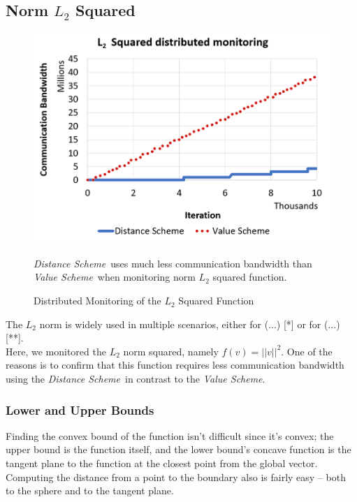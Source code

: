 \documentclass[10pt, conference]{IEEEtran}
\newcommand{\valueScheme}{\textit{Value Scheme}}
\newcommand{\distanceScheme}{\textit{Distance Scheme}}
\begin{document}
\subsection{Norm $L_2$ Squared} \label{L2SquaredExperiment}
\begin{figure}[t]
\includegraphics[width=\linewidth]{Pics/PNGs/L2NormCommunicationDiagram.png}
\caption{Distributed Monitoring of the $L_2$ Squared Function}
\medskip
\small
\distanceScheme \ uses much less communication bandwidth than \valueScheme \ when monitoring norm $L_2$ squared function.
\label{SphereMonitoring}
\end{figure} 
The $L_2$ norm is widely used in multiple scenarios, either for (...) [*] or for (...) [**]. \\
Here, we monitored the $L_2$ norm squared, namely ${f(v) = ||v||^2}$. One of the reasons is to confirm that this function requires less communication bandwidth using the \distanceScheme \ in contrast to the \valueScheme . \\
\subsubsection{Lower and Upper Bounds}
Finding the convex bound of the function isn't difficult since it's convex; the upper bound is the function itself, and the lower bound's concave function is the tangent plane to the function at the closest point from the global vector. Computing the distance from a point to the boundary also is fairly easy -- both to the sphere and to the tangent plane. \\
\end{document}
